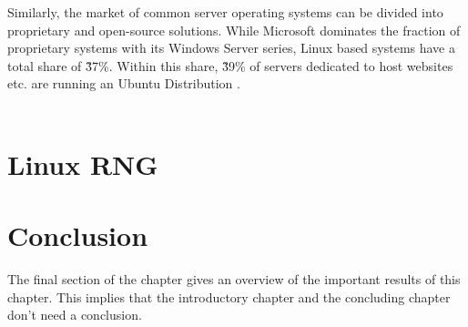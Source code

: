 Similarly, the market of common server operating systems can be divided into proprietary and open-source solutions. While Microsoft dominates the fraction of proprietary systems with its Windows Server series, Linux based systems have a total share of \~37\%. Within this share, \~39\% of servers dedicated to host websites etc. are running an Ubuntu Distribution \cite{statsharelinux} . \\~\\


\section{Linux RNG}
%
%


\section{Conclusion}
The final section of the chapter gives an overview of the important results
of this chapter. This implies that the introductory chapter and the
concluding chapter don't need a conclusion.

\lipsum[66]

